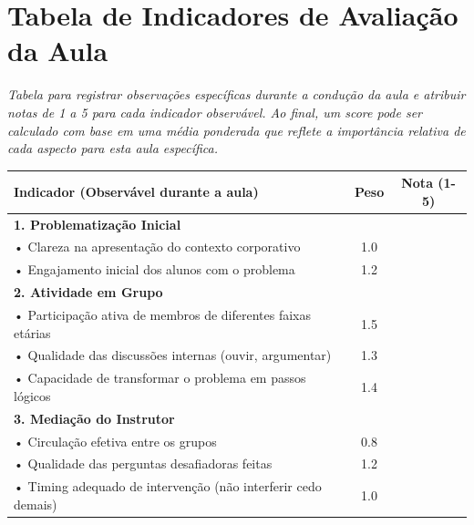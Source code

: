 \documentclass{lesson_plan}
\begin{document}
\newpage

\section{Tabela de Indicadores de Avaliação da Aula}
\textit{
Tabela para registrar observações específicas durante a condução da aula e atribuir notas de 1 a 5 para cada indicador observável. Ao final, um score pode ser calculado com base em uma média ponderada que reflete a importância relativa de cada aspecto para esta aula específica.}

\vspace{0.5cm}

\begin{center}
{\scriptsize
\renewcommand{\arraystretch}{1.4}
\begin{tabular}{|p{10cm}|c|c|}
\hline
\textbf{Indicador (Observável durante a aula)} & \textbf{Peso} & \textbf{Nota (1-5)} \\
\hline
\hline
\textbf{1. Problematização Inicial} & & \\
\hspace{0.2cm} • Clareza na apresentação do contexto corporativo & 1.0 & \\
\hspace{0.2cm} • Engajamento inicial dos alunos com o problema & 1.2 & \\
\hline
\textbf{2. Atividade em Grupo} & & \\
\hspace{0.2cm} • Participação ativa de membros de diferentes faixas etárias & 1.5 & \\
\hspace{0.2cm} • Qualidade das discussões internas (ouvir, argumentar) & 1.3 & \\
\hspace{0.2cm} • Capacidade de transformar o problema em passos lógicos & 1.4 & \\
\hline
\textbf{3. Mediação do Instrutor} & & \\
\hspace{0.2cm} • Circulação efetiva entre os grupos & 0.8 & \\
\hspace{0.2cm} • Qualidade das perguntas desafiadoras feitas & 1.2 & \\
\hspace{0.2cm} • Timing adequado de intervenção (não interferir cedo demais) & 1.0 & \\

\end{tabular}}
\end{center}
\end{document}
